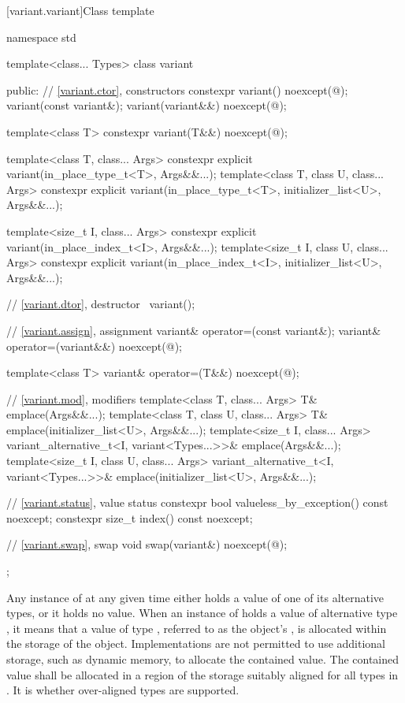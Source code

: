 %
[variant.variant]{Class template }

\begin{codeblock}
namespace std {
  template<class... Types>
    class variant {
    public:
      // \ref{variant.ctor}, constructors
      constexpr variant() noexcept(@\seebelow@);
      variant(const variant&);
      variant(variant&&) noexcept(@\seebelow@);

      template<class T>
        constexpr variant(T&&) noexcept(@\seebelow@);

      template<class T, class... Args>
        constexpr explicit variant(in_place_type_t<T>, Args&&...);
      template<class T, class U, class... Args>
        constexpr explicit variant(in_place_type_t<T>, initializer_list<U>, Args&&...);

      template<size_t I, class... Args>
        constexpr explicit variant(in_place_index_t<I>, Args&&...);
      template<size_t I, class U, class... Args>
        constexpr explicit variant(in_place_index_t<I>, initializer_list<U>, Args&&...);

      // \ref{variant.dtor}, destructor
      ~variant();

      // \ref{variant.assign}, assignment
      variant& operator=(const variant&);
      variant& operator=(variant&&) noexcept(@\seebelow@);

      template<class T> variant& operator=(T&&) noexcept(@\seebelow@);

      // \ref{variant.mod}, modifiers
      template<class T, class... Args>
        T& emplace(Args&&...);
      template<class T, class U, class... Args>
        T& emplace(initializer_list<U>, Args&&...);
      template<size_t I, class... Args>
        variant_alternative_t<I, variant<Types...>>& emplace(Args&&...);
      template<size_t I, class U, class... Args>
        variant_alternative_t<I, variant<Types...>>& emplace(initializer_list<U>, Args&&...);

      // \ref{variant.status}, value status
      constexpr bool valueless_by_exception() const noexcept;
      constexpr size_t index() const noexcept;

      // \ref{variant.swap}, swap
      void swap(variant&) noexcept(@\seebelow@);
    };
}
\end{codeblock}

\pnum
Any instance of  at any given time either holds a value
of one of its alternative types, or it holds no value.
When an instance of  holds a value of alternative type ,
it means that a value of type , referred to as the 
object's , is allocated within the storage of the
 object.
Implementations are not permitted to use additional storage, such as dynamic
memory, to allocate the contained value.
The contained value shall be allocated in a region of the 
storage suitably aligned for all types in .
It is 
whether over-aligned types are supported.


